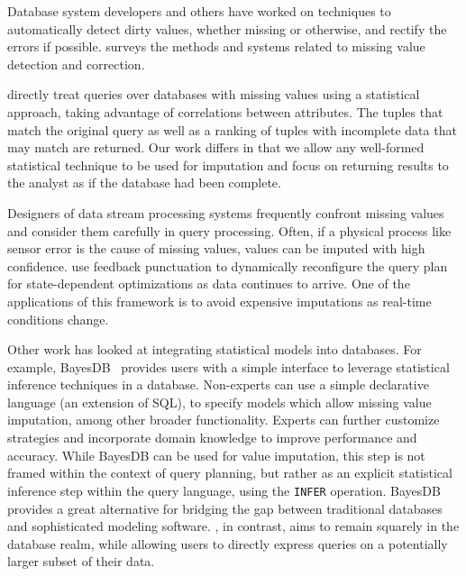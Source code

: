 Database system developers and others have worked on techniques to automatically
detect dirty values, whether missing or otherwise, and rectify the errors if
possible. \textcite*{hellerstein2008quantitative} surveys the methods and systems related to missing value detection and correction.

\textcite*{wolf2007query} directly treat queries over databases with missing values using a statistical approach, taking advantage of correlations between
attributes. The tuples that match the original query as well as a ranking of
tuples with incomplete data that may match are returned. Our work differs in
that we allow any well-formed statistical technique to be used for imputation
and focus on returning results to the analyst as if the database had been
complete.

Designers of data stream processing systems frequently confront missing values
and consider them carefully in query processing. Often, if a physical process
like sensor error is the cause of missing values, values can be imputed with
high confidence. \textcite*{fernandez2009inter} use feedback punctuation to
dynamically
reconfigure the query plan for state-dependent
optimizations as data continues to arrive. One of the applications of this framework is to avoid
expensive imputations as real-time conditions change. 

Other work has looked at integrating statistical models into databases.
For example, BayesDB~\cite{mansinghka2015bayesdb} provides users with a simple interface to leverage statistical inference techniques in a database. Non-experts
can use a simple declarative language (an extension of SQL), to specify models
which allow missing value imputation, among other broader functionality.
Experts can further customize strategies and incorporate domain knowledge to
improve performance and accuracy.
While BayesDB can be used for value imputation, this step is not framed
within the context of query planning, but rather as an explicit statistical
inference step within the query language, using the \verb|INFER| operation. 
BayesDB provides a great alternative for bridging the gap between
traditional databases and sophisticated modeling software. \ProjectName{}, in
contrast, aims to remain squarely in the database realm, while allowing
users to directly express queries on a potentially larger subset of their data.


